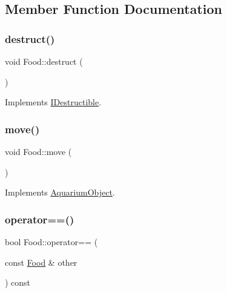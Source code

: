 \subsection{Member Function Documentation}
\mbox{\label{class_food_a5e1bfe34f8a4f4ce60accc57212c95c8}} 
\subsubsection{\texorpdfstring{destruct()}{destruct()}}
{\footnotesize\ttfamily void Food\+::destruct (\begin{DoxyParamCaption}{ }\end{DoxyParamCaption})\hspace{0.3cm}{\ttfamily [virtual]}}



Implements \mbox{\hyperlink{class_i_destructible_a63016d1bb4daa0a726fc8add9a0be62d}{I\+Destructible}}.

\mbox{\label{class_food_afb37f87b673df87697665ae82b6da0da}} 
\subsubsection{\texorpdfstring{move()}{move()}}
{\footnotesize\ttfamily void Food\+::move (\begin{DoxyParamCaption}{ }\end{DoxyParamCaption})\hspace{0.3cm}{\ttfamily [virtual]}}



Implements \mbox{\hyperlink{class_aquarium_object_a42c4de640f89ac8aebc26b7618578575}{Aquarium\+Object}}.

\mbox{\label{class_food_a7199d2bd48ecae8ffbbf1be8a39c5311}} 
\subsubsection{\texorpdfstring{operator==()}{operator==()}}
{\footnotesize\ttfamily bool Food\+::operator== (\begin{DoxyParamCaption}\item[{const \mbox{\hyperlink{class_food}{Food}} \&}]{other }\end{DoxyParamCaption}) const}



